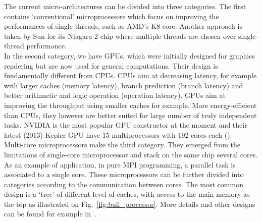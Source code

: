 The current micro-architectures can be divided into three categories. The first
contains `conventional' microprocessors which focus on improving the
performances of single \glspl{thread}, such as AMD's K8 core. Another
approach is taken by Sun for its Niagara 2 chip where multiple threads are
chosen over single-thread performance. \\
In the second category, we have \glspl{GPU}, which were initially designed for
graphics rendering but are now used for general computations. Their design is
fundamentally different from \glspl{CPU}. CPUs aim at decreasing latency, for
example with larger caches (memory latency), branch prediction (branch latency)
and better arithmetic and logic operation (operation latency). GPUs aim at
improving the throughput using smaller caches for example. More energy-efficient
than CPUs, they however are better suited for large number of truly independent
tasks. NVIDIA is the most popular GPU constructor at the moment and their latest
(2013) Kepler GPU have 15 multiprocessors with 192 cores each
(\cite{nvidia2012}).\\
Multi-core microprocessors make the third category. They emerged from the
limitations of single-core microprocessor and stack on the same chip several
cores. As an example of application, in pure MPI programming, a parallel task is
associated to a single core. These microprocessors can be further divided into
categories according to the communication between cores.  The most common design
is a `tree' of different level of caches, with access to the main memory as the
top as illustrated on Fig.~\ref{fig:bull_processor}.  More details and other
designs can be found for example in~\cite{Kogge2008}.

